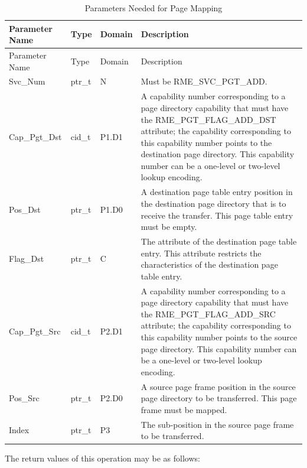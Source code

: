 \begin{xltabular}{\textwidth}{@{}>{\hsize\raggedright\arraybackslash}X>{\hsize\raggedright\arraybackslash}X>{\hsize\raggedright\arraybackslash}X>{\hsize\raggedright\arraybackslash}X@{}}
\caption{Parameters Needed for Page Mapping}\label{tab:3-14-map-memory-page-parameters}\\
\toprule
Parameter Name & Type & Domain & Description\tabularnewline
\endfirsthead
\toprule
Parameter Name & Type & Domain & Description\tabularnewline
\midrule
\endhead
\bottomrule
\endlastfoot
Svc\_Num & ptr\_t & N & Must be RME\_SVC\_PGT\_ADD.\tabularnewline
Cap\_Pgt\_Dst & cid\_t & P1.D1 &
A capability number corresponding to a page directory capability that must have the RME\_PGT\_FLAG\_ADD\_DST attribute; the capability corresponding to this capability number points to the destination page directory. This capability number can be a one-level or two-level lookup encoding.\tabularnewline
Pos\_Dst & ptr\_t & P1.D0 &
A destination page table entry position in the destination page directory that is to receive the transfer. This page table entry must be empty.\tabularnewline
Flag\_Dst & ptr\_t & C &
The attribute of the destination page table entry. This attribute restricts the characteristics of the destination page table entry.\tabularnewline
Cap\_Pgt\_Src & cid\_t & P2.D1 &
A capability number corresponding to a page directory capability that must have the RME\_PGT\_FLAG\_ADD\_SRC attribute; the capability corresponding to this capability number points to the source page directory. This capability number can be a one-level or two-level lookup encoding.\tabularnewline
Pos\_Src & ptr\_t & P2.D0 &
A source page frame position in the source page directory to be transferred. This page frame must be mapped.\tabularnewline
Index & ptr\_t & P3 & The sub-position in the source page frame to be transferred.\tabularnewline
\end{xltabular}
\nopagebreak[4]

The return values of this operation may be as follows:


